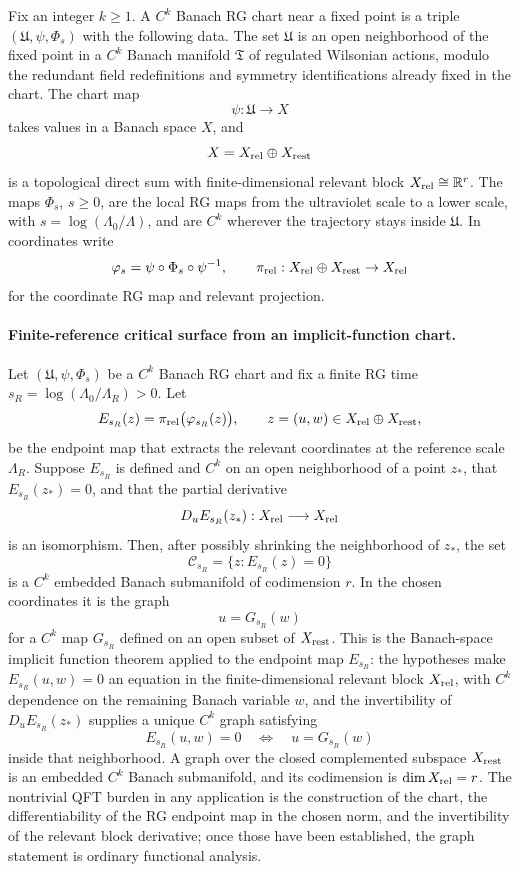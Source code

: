 \begin{definition}
Fix an integer \(k\geq1\).  A \(C^k\) Banach RG chart near a fixed point is a
triple \((\mathfrak U,\psi,\Phi_s)\) with the following data.  The set
\(\mathfrak U\) is an open neighborhood of the fixed point in a \(C^k\)
Banach manifold \(\mathfrak T\) of regulated Wilsonian actions, modulo the
redundant field redefinitions and symmetry identifications already fixed in
the chart.  The chart map
\[
  \psi:\mathfrak U\longrightarrow X
\]
takes values in a Banach space \(X\), and
\[
  X=X_{\rm rel}\oplus X_{\rm rest}
\]
is a topological direct sum with finite-dimensional relevant block
\(X_{\rm rel}\cong\mathbb R^r\).  The maps \(\Phi_s\), \(s\geq0\), are the
local RG maps from the ultraviolet scale to a lower scale, with
\(s=\log(\Lambda_0/\Lambda)\), and are \(C^k\) wherever the trajectory stays
inside \(\mathfrak U\).  In coordinates write
\[
  \varphi_s=\psi\circ\Phi_s\circ\psi^{-1},
  \qquad
  \pi_{\rm rel}:X_{\rm rel}\oplus X_{\rm rest}\to X_{\rm rel}
\]
for the coordinate RG map and relevant projection.
\end{definition}

\paragraph{Finite-reference critical surface from an implicit-function chart.}
Let \((\mathfrak U,\psi,\Phi_s)\) be a \(C^k\) Banach RG chart and fix a finite
RG time \(s_R=\log(\Lambda_0/\Lambda_R)>0\).  Let
\[
  E_{s_R}(z)=\pi_{\rm rel}\bigl(\varphi_{s_R}(z)\bigr),
  \qquad
  z=(u,w)\in X_{\rm rel}\oplus X_{\rm rest},
\]
be the endpoint map that extracts the relevant coordinates at the reference
scale \(\Lambda_R\).  Suppose \(E_{s_R}\) is defined and \(C^k\) on an open
neighborhood of a point \(z_*\), that \(E_{s_R}(z_*)=0\), and that the
partial derivative
\[
  D_uE_{s_R}(z_*):X_{\rm rel}\longrightarrow X_{\rm rel}
\]
is an isomorphism.  Then, after possibly shrinking the neighborhood of
\(z_*\), the set
\[
  \mathcal C_{s_R}=\{z:E_{s_R}(z)=0\}
\]
is a \(C^k\) embedded Banach submanifold of codimension \(r\).  In the chosen
coordinates it is the graph
\[
  u=G_{s_R}(w)
\]
for a \(C^k\) map \(G_{s_R}\) defined on an open subset of \(X_{\rm rest}\).
This is the Banach-space implicit function theorem applied to the endpoint
map \(E_{s_R}\): the hypotheses make \(E_{s_R}(u,w)=0\) an equation in the
finite-dimensional relevant block \(X_{\rm rel}\), with \(C^k\) dependence on
the remaining Banach variable \(w\), and the invertibility of
\(D_uE_{s_R}(z_*)\) supplies a unique \(C^k\) graph satisfying
\[
  E_{s_R}(u,w)=0
  \quad\Longleftrightarrow\quad
  u=G_{s_R}(w)
\]
inside that neighborhood.  A graph over the closed complemented subspace
\(X_{\rm rest}\) is an embedded \(C^k\) Banach submanifold, and its
codimension is \(\dim X_{\rm rel}=r\).  The nontrivial QFT burden in any
application is the construction of the chart, the differentiability of the
RG endpoint map in the chosen norm, and the invertibility of the relevant
block derivative; once those have been established, the graph statement is
ordinary functional analysis.

